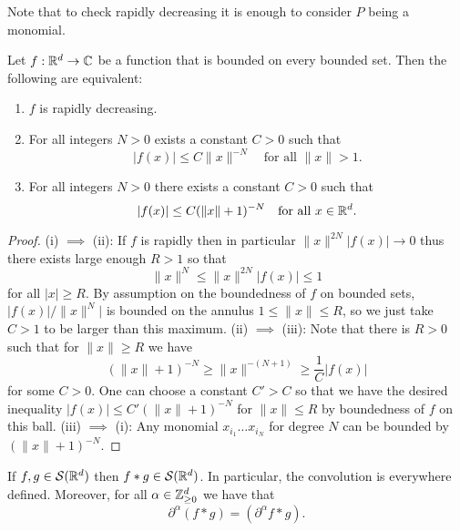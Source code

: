 \documentclass[twoside, a4paper, 10pt]{amsart}
\begin{document}
Note that to check rapidly decreasing it is enough to consider $P$ being a monomial.

\begin{lemma} Let $f:\mathbb{R}^d \to \mathbb{C}$ be a function that is bounded on every bounded set. Then the following are equivalent:

\begin{enumerate}
	\item $f$ is rapidly decreasing.
	\item For all integers $N>0$ exists a constant $C>0$ such that $$|f(x)| \leq C\| x \|^{-N} \quad\text{for all } \|x\| > 1.$$
	\item For all integers $N>0$ there exists a constant $C>0$ such that $$|f(x)| \leq C(\| x \| + 1)^{-N} \quad\text{for all } x \in \mathbb{R}^d.$$
\end{enumerate}

\end{lemma}

\begin{proof} (i) $\implies$ (ii): If $f$ is rapidly then in particular $\|x\|^{2N}|f(x)| \to 0$ thus there exists large enough $R>1$ so that $$\|x\|^{N} \leq \|x\|^{2N}|f(x)| \leq 1$$ for all $|x| \geq R$. By assumption on the boundedness of $f$ on bounded sets, $|f(x)|/\|x\|^{N}|$ is bounded on the annulus $1\leq \|x\| \leq R$, so we just take $C>1$ to be larger than this maximum. (ii) $\implies$ (iii): Note that there is $R>0$ such that for $\|x \| \geq R$ we have $$(\|x \|+1)^{-N} \geq \| x \|^{-(N+1)} \geq \frac{1}{C}|f(x)|$$ for some $C>0$. One can choose a constant $C'>C$ so that we have the desired inequality $|f(x)| \leq C'(\| x \| + 1)^{-N}$ for $\|x \| \leq R$ by boundedness of $f$ on this ball. (iii) $\implies$ (i): Any monomial $x_{i_1} \ldots x_{i_N}$ for degree $N$ can be bounded by $(\|x\| + 1)^{-N}$. \end{proof}


\begin{prop} If $f,g \in \mathcal{S}(\mathbb{R}^d)$ then $f*g \in \mathcal{S}(\mathbb{R}^d)$. In particular, the convolution is everywhere defined. Moreover, for all $\alpha \in \mathbb{Z}_{\geq 0}^d$ we have that $$\partial^{\alpha} (f * g) = (\partial^{\alpha}f * g).$$

\end{prop}
\end{document}
